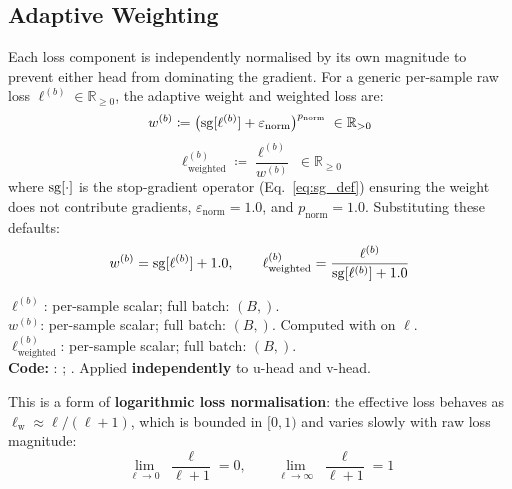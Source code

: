 \subsection{Adaptive Weighting}
\label{sec:adaptive}

Each loss component is independently normalised by its own magnitude to prevent
either head from dominating the gradient.  For a generic per-sample raw loss
$\ell^{(b)} \in \mathbb{R}_{\ge 0}$, the adaptive weight and weighted loss
are:
\begin{equation}
  w^{(b)}
    \coloneqq \bigl(\operatorname{sg}[\ell^{(b)}] + \varepsilon_{\mathrm{norm}}\bigr)^{p_{\mathrm{norm}}}
    \;\in \mathbb{R}_{> 0}
  \label{eq:adaptive_weight}
\end{equation}
\begin{equation}
  \ell^{(b)}_{\mathrm{weighted}}
    \coloneqq \frac{\ell^{(b)}}{w^{(b)}}
    \;\in \mathbb{R}_{\ge 0}
  \label{eq:adaptive_weighted_loss}
\end{equation}
where $\operatorname{sg}[\cdot]$ is the stop-gradient operator (Eq.~\ref{eq:sg_def})
ensuring the weight does not contribute gradients, $\varepsilon_{\mathrm{norm}}
= 1.0$, and $p_{\mathrm{norm}} = 1.0$.  Substituting these defaults:
\begin{equation}
  w^{(b)} = \operatorname{sg}[\ell^{(b)}] + 1.0,
  \qquad
  \ell^{(b)}_{\mathrm{weighted}}
    = \frac{\ell^{(b)}}{\operatorname{sg}[\ell^{(b)}] + 1.0}
  \label{eq:adaptive_simplified}
\end{equation}
\begin{shapes}
$\ell^{(b)}$: per-sample scalar; full batch: $(B,)$.\\
$w^{(b)}$: per-sample scalar; full batch: $(B,)$. Computed with  on $\ell$.\\
$\ell^{(b)}_{\mathrm{weighted}}$: per-sample scalar; full batch: $(B,)$.\\
\textbf{Code:} :
;
.
Applied \textbf{independently} to u-head and v-head.
\end{shapes}

\noindent
This is a form of \textbf{logarithmic loss normalisation}: the effective loss
behaves as $\ell_\mathrm{w} \approx \ell/(\ell+1)$, which is bounded in
$[0,1)$ and varies slowly with raw loss magnitude:
\begin{equation}
  \lim_{\ell \to 0}\;\frac{\ell}{\ell + 1} = 0,
  \qquad
  \lim_{\ell \to \infty}\;\frac{\ell}{\ell + 1} = 1
\end{equation}

